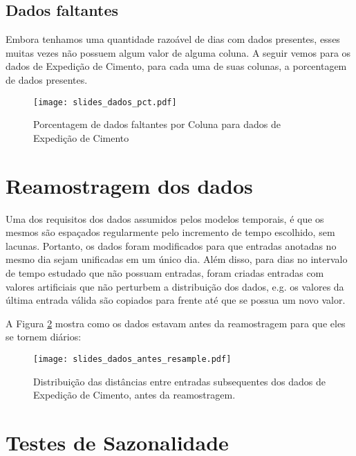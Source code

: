 \subsection{Dados faltantes}

Embora tenhamos uma quantidade razoável de dias com dados presentes, esses muitas vezes não possuem algum valor de alguma coluna.
A seguir vemos para os dados de Expedição de Cimento, para cada uma de suas colunas, a porcentagem de dados presentes. 


\begin{figure}[H]
  \centering
  \texttt{[image: slides\_dados\_pct.pdf]}
  \caption{Porcentagem de dados faltantes por Coluna para dados de Expedição de Cimento}
  \label{fig:dadosfalta}
\end{figure}


\section{Reamostragem dos dados}

Uma dos requisitos dos dados assumidos pelos modelos temporais, é que os mesmos
são espaçados regularmente pelo incremento de tempo escolhido, sem lacunas.
Portanto, os dados foram modificados para que entradas anotadas no mesmo dia
sejam unificadas em um único dia. Além disso, para dias no intervalo de tempo
estudado que não possuam entradas, foram criadas entradas com valores
artificiais que não perturbem a distribuição dos dados, e.g. os valores da
última entrada válida são copiados para frente até que se possua um novo valor.

A Figura \ref{fig:reamos} mostra como os dados estavam antes da reamostragem
para que eles se tornem diários: 

\begin{figure}[H]
  \centering
  \texttt{[image: slides\_dados\_antes\_resample.pdf]}
  \caption{Distribuição das distâncias entre entradas subsequentes dos dados de Expedição de Cimento, antes da reamostragem.}
  \label{fig:reamos}
\end{figure}



\section{Testes de Sazonalidade}

